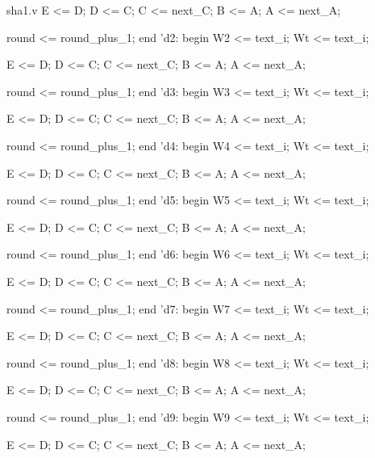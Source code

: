 \begin{chunk}{sha1.v}
          E <= D;
          D <= C;
          C <= next_C;
          B <= A;
          A <= next_A;
            
          round <= round_plus_1;
        end
      'd2:
        begin
          W2 <= text_i;
          Wt <= text_i;
          
          E <= D;
          D <= C;
          C <= next_C;
          B <= A;
          A <= next_A;
            
          round <= round_plus_1;
        end
      'd3:
        begin
          W3 <= text_i;
          Wt <= text_i;
          
          E <= D;
          D <= C;
          C <= next_C;
          B <= A;
          A <= next_A;
            
          round <= round_plus_1;
        end
      'd4:
        begin
          W4 <= text_i;
          Wt <= text_i;
          
          E <= D;
          D <= C;
          C <= next_C;
          B <= A;
          A <= next_A;
            
          round <= round_plus_1;
        end
      'd5:
        begin
          W5 <= text_i;
          Wt <= text_i;
          
          E <= D;
          D <= C;
          C <= next_C;
          B <= A;
          A <= next_A;
            
          round <= round_plus_1;
        end
      'd6:
        begin
          W6 <= text_i;
          Wt <= text_i;
          
          E <= D;
          D <= C;
          C <= next_C;
          B <= A;
          A <= next_A;
            
          round <= round_plus_1;
        end
      'd7:
        begin
          W7 <= text_i;
          Wt <= text_i;
          
          E <= D;
          D <= C;
          C <= next_C;
          B <= A;
          A <= next_A;
            
          round <= round_plus_1;
        end
      'd8:
        begin
          W8 <= text_i;
          Wt <= text_i;
          
          E <= D;
          D <= C;
          C <= next_C;
          B <= A;
          A <= next_A;
            
          round <= round_plus_1;
        end
      'd9:
        begin
          W9 <= text_i;
          Wt <= text_i;
          
          E <= D;
          D <= C;
          C <= next_C;
          B <= A;
          A <= next_A;
            

\end{chunk}
